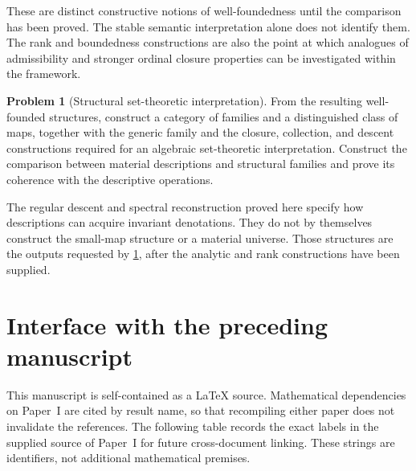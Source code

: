 \documentclass[11pt,a4paper]{article}
\numberwithin{equation}{section}
\theoremstyle{definition}
\newtheorem{problem}[problem]{Problem}
\theoremstyle{remark}
\theoremstyle{plain}
\begin{document}
These are distinct constructive notions of well-foundedness until the
comparison has been proved. The stable semantic interpretation alone
does not identify them. The rank and boundedness constructions are also
the point at which analogues of admissibility and stronger ordinal
closure properties can be investigated within the framework.

\begin{problem}[Structural set-theoretic interpretation]
\label{prob:structural-sets}
From the resulting well-founded structures, construct a category of
families and a distinguished class of maps, together with the generic
family and the closure, collection, and descent constructions required
for an algebraic set-theoretic interpretation. Construct the comparison
between material descriptions and structural families and prove its
coherence with the descriptive operations.
\end{problem}

The regular descent and spectral reconstruction proved here specify
how descriptions can acquire invariant denotations. They do not by
themselves construct the small-map structure or a material universe.
Those structures are the outputs requested by
\cref{prob:structural-sets}, after the analytic and rank constructions
have been supplied.

\appendix
\section{Interface with the preceding manuscript}
\label{app:imports}

This manuscript is self-contained as a LaTeX source. Mathematical
dependencies on Paper~I are cited by result name, so that recompiling
either paper does not invalidate the references. The following table
records the exact labels in the supplied source of Paper~I for future
cross-document linking. These strings are identifiers, not additional
mathematical premises.
\end{document}
